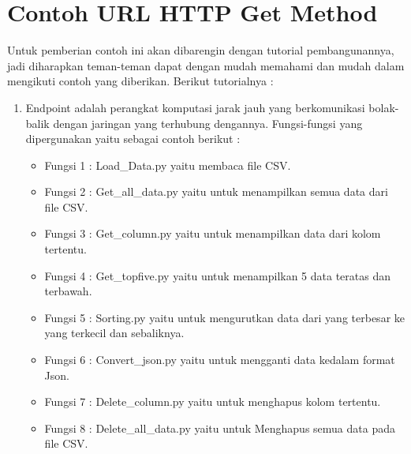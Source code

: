 \section {Contoh URL HTTP Get Method}
Untuk pemberian contoh ini akan dibarengin dengan tutorial pembangunannya, jadi diharapkan teman-teman dapat dengan mudah memahami dan mudah dalam mengikuti contoh yang diberikan. Berikut tutorialnya :
\begin{enumerate}
  \item Endpoint adalah perangkat komputasi jarak jauh yang berkomunikasi bolak-balik dengan jaringan yang terhubung dengannya. Fungsi-fungsi yang dipergunakan yaitu sebagai contoh berikut :
      \begin{itemize}
        \item Fungsi 1 : Load_Data.py yaitu membaca file CSV.
            
        \item Fungsi 2 : Get_all_data.py yaitu untuk menampilkan semua data dari file CSV.
            
        \item Fungsi 3 : Get_column.py yaitu untuk menampilkan data dari kolom tertentu.
            
        \item Fungsi 4 : Get_topfive.py yaitu untuk menampilkan 5 data teratas dan terbawah.
            
        \item Fungsi 5 : Sorting.py yaitu untuk mengurutkan data dari yang terbesar ke yang terkecil dan sebaliknya.
            
        \item Fungsi 6 : Convert_json.py yaitu untuk mengganti data kedalam format Json.
            
        \item Fungsi 7 : Delete_column.py yaitu untuk menghapus kolom tertentu.
            
        \item Fungsi 8 : Delete_all_data.py yaitu untuk Menghapus semua data pada file CSV.

\end{itemize}
\end{enumerate}
